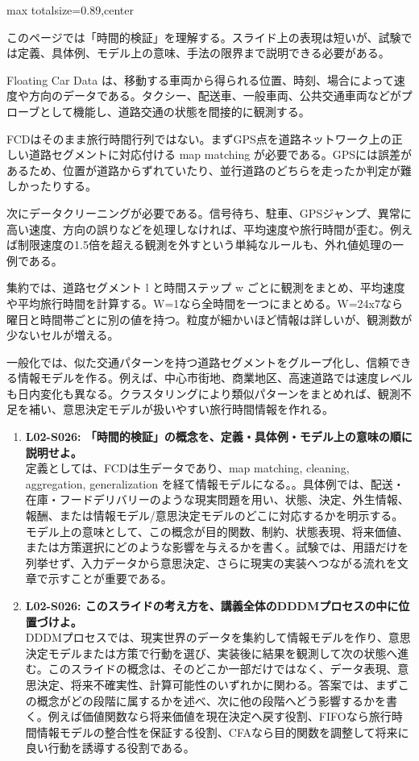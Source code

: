 \begin{minipage}[t]{0.58\textwidth}
\begin{adjustbox}{max totalsize={\textwidth}{0.89\textheight},center}
\begin{minipage}{\textwidth}\scriptsize
{}このページでは「時間的検証」を理解する。スライド上の表現は短いが、試験では定義、具体例、モデル上の意味、手法の限界まで説明できる必要がある。\par
Floating Car Data は、移動する車両から得られる位置、時刻、場合によって速度や方向のデータである。タクシー、配送車、一般車両、公共交通車両などがプローブとして機能し、道路交通の状態を間接的に観測する。\par
FCDはそのまま旅行時間行列ではない。まずGPS点を道路ネットワーク上の正しい道路セグメントに対応付ける map matching が必要である。GPSには誤差があるため、位置が道路からずれていたり、並行道路のどちらを走ったか判定が難しかったりする。\par
次にデータクリーニングが必要である。信号待ち、駐車、GPSジャンプ、異常に高い速度、方向の誤りなどを処理しなければ、平均速度や旅行時間が歪む。例えば制限速度の1.5倍を超える観測を外すという単純なルールも、外れ値処理の一例である。\par
集約では、道路セグメント l と時間ステップ w ごとに観測をまとめ、平均速度や平均旅行時間を計算する。W=1なら全時間を一つにまとめる。W=24x7なら曜日と時間帯ごとに別の値を持つ。粒度が細かいほど情報は詳しいが、観測数が少ないセルが増える。\par
一般化では、似た交通パターンを持つ道路セグメントをグループ化し、信頼できる情報モデルを作る。例えば、中心市街地、商業地区、高速道路では速度レベルも日内変化も異なる。クラスタリングにより類似パターンをまとめれば、観測不足を補い、意思決定モデルが扱いやすい旅行時間情報を作れる。\par{}\begin{enumerate}\item \textbf{L02-S026: 「時間的検証」の概念を、定義・具体例・モデル上の意味の順に説明せよ。}\\定義としては、FCDは生データであり、map matching, cleaning, aggregation, generalization を経て情報モデルになる。。具体例では、配送・在庫・フードデリバリーのような現実問題を用い、状態、決定、外生情報、報酬、または情報モデル/意思決定モデルのどこに対応するかを明示する。モデル上の意味として、この概念が目的関数、制約、状態表現、将来価値、または方策選択にどのような影響を与えるかを書く。試験では、用語だけを列挙せず、入力データから意思決定、さらに現実の実装へつながる流れを文章で示すことが重要である。\item \textbf{L02-S026: このスライドの考え方を、講義全体のDDDMプロセスの中に位置づけよ。}\\DDDMプロセスでは、現実世界のデータを集約して情報モデルを作り、意思決定モデルまたは方策で行動を選び、実装後に結果を観測して次の状態へ進む。このスライドの概念は、そのどこか一部だけではなく、データ表現、意思決定、将来不確実性、計算可能性のいずれかに関わる。答案では、まずこの概念がどの段階に属するかを述べ、次に他の段階へどう影響するかを書く。例えば価値関数なら将来価値を現在決定へ戻す役割、FIFOなら旅行時間情報モデルの整合性を保証する役割、CFAなら目的関数を調整して将来に良い行動を誘導する役割である。\end{enumerate}

\end{minipage}
\end{adjustbox}
\end{minipage}

